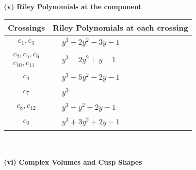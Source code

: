\documentclass[1p]{elsarticle_modified}
\theoremstyle{definition}
\begin{document}
\newpage\renewcommand{\arraystretch}{1}
\flushleft \textbf{(v) Riley Polynomials at the component}\newline \\
\begin{tabular}{m{50pt}|m{274pt}}
Crossings & \hspace{64pt}Riley Polynomials at each crossing \\
\hline $$\begin{aligned}c_{1},c_{3}\end{aligned}$$&$\begin{aligned}
&y^3-2 y^2-3 y-1
\end{aligned}$\\
\hline $$\begin{aligned}c_{2},c_{5},c_{6}\\c_{10},c_{11}\end{aligned}$$&$\begin{aligned}
&y^3-2 y^2+y-1
\end{aligned}$\\
\hline $$\begin{aligned}c_{4}\end{aligned}$$&$\begin{aligned}
&y^3-5 y^2-2 y-1
\end{aligned}$\\
\hline $$\begin{aligned}c_{7}\end{aligned}$$&$\begin{aligned}
&y^3
\end{aligned}$\\
\hline $$\begin{aligned}c_{8},c_{12}\end{aligned}$$&$\begin{aligned}
&y^3- y^2+2 y-1
\end{aligned}$\\
\hline $$\begin{aligned}c_{9}\end{aligned}$$&$\begin{aligned}
&y^3+3 y^2+2 y-1
\end{aligned}$\\
\hline
\end{tabular}\\~\\
\newpage\flushleft \textbf{(vi) Complex Volumes and Cusp Shapes}
\end{document}
